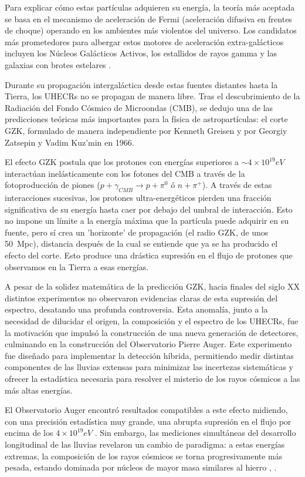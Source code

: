 Para explicar cómo estas partículas adquieren su energía, la teoría más aceptada se basa en el mecanismo de aceleración de Fermi (aceleración difusiva en frentes de choque) operando en los ambientes más violentos del universo. Los candidatos más prometedores para albergar estos motores de aceleración extra-galácticos incluyen los Núcleos Galácticos Activos, los estallidos de rayos gamma y las galaxias con brotes estelares \cite{aloisio2017}.

Durante su propagación intergaláctica desde estas fuentes distantes hasta la Tierra, los UHECRs no se propagan de manera libre. Tras el descubrimiento de la Radiación del Fondo Cósmico de Microondas (CMB), se dedujo una de las predicciones teóricas más importantes para la física de astropartículas: el corte GZK, formulado de manera independiente por Kenneth Greisen \cite{greisen1966} y por Georgiy Zatsepin y Vadim Kuz'min \cite{zatsepin1966} en 1966.

El efecto GZK postula que los protones con energías superiores a $\sim 4 \times 10^{19}eV$ interactúan inelásticamente con los fotones del CMB a través de la fotoproducción de piones ($p + \gamma_{CMB} \to p + \pi^0$ ó $n + \pi^+$). A través de estas interacciones sucesivas, los protones ultra-energéticos pierden una fracción significativa de su energía hasta caer por debajo del umbral de interacción. Esto no impone un límite a la energía máxima que la partícula puede adquirir en su fuente, pero sí crea un 'horizonte' de propagación (el radio GZK, de unos 50~Mpc), distancia después de la cual se entiende que ya se ha producido el efecto del corte. Esto produce una drástica supresión en el flujo de protones que observamos en la Tierra a esas energías.

A pesar de la solidez matemática de la predicción GZK, hacia finales del siglo XX distintos experimentos no observaron evidencias claras de esta supresión del espectro, desatando una profunda controversia. Esta anomalía, junto a la necesidad de dilucidar el origen, la composición y el espectro de los UHECRs, fue la motivación que impulsó la construcción de una nueva generación de detectores, culminando en la construcción del Observatorio Pierre Auger. Este experimento fue diseñado para implementar la detección híbrida, permitiendo medir distintas componentes de las lluvias extensas para minimizar las incertezas sistemáticas y ofrecer la estadística necesaria para resolver el misterio de los rayos cósmicos a las más altas energías.

El Observatorio Auger encontró resultados compatibles a este efecto midiendo, con una precisión estadística muy grande, una abrupta supresión en el flujo por encima de los $4 \times 10^{19}eV$ \cite{augerSpectrum2020}. Sin embargo, las mediciones simultáneas del desarrollo longitudinal de las lluvias revelaron un cambio de paradigma: a estas energías extremas, la composición de los rayos cósmicos se torna progresivamente más pesada, estando dominada por núcleos de mayor masa similares al hierro \cite{augerComposition2017}, \cite{aloisio2017}.

